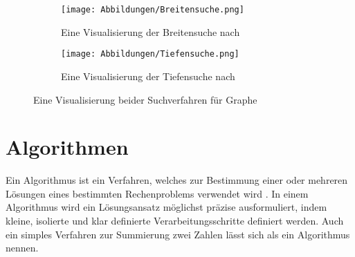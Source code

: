 \begin{figure}[t]
	\centering
	\begin{subfigure}[h]{0.49\textwidth}
		\texttt{[image: Abbildungen/Breitensuche.png]}
		\centering
		\caption{Eine Visualisierung der Breitensuche nach \textcite[228]{knebl_algorithmen_2021}}
		\label{fig: breitensuche}
	\end{subfigure}
	\hfill
	\begin{subfigure}[h]{0.49\textwidth}
		\texttt{[image: Abbildungen/Tiefensuche.png]}
		\centering
		\caption{Eine Visualisierung der Tiefensuche nach \textcite[232]{knebl_algorithmen_2021}}
		\label{fig: tiefensuche}
	\end{subfigure}
	\caption{Eine Visualisierung beider Suchverfahren für Graphe}
	\label{fig: graph_search_functions}
\end{figure}

\section{Algorithmen}

Ein Algorithmus ist ein Verfahren, welches zur Bestimmung einer oder mehreren Lösungen eines bestimmten Rechenproblems verwendet wird \autocite[1]{knebl_algorithmen_2021}. In einem Algorithmus wird ein Lösungsansatz möglichst präzise ausformuliert, indem kleine, isolierte und klar definierte Verarbeitungsschritte definiert werden. Auch ein simples Verfahren zur Summierung zwei Zahlen lässt sich als ein Algorithmus nennen. \autocite[9-10]{hubwieser_fundamente_2015}